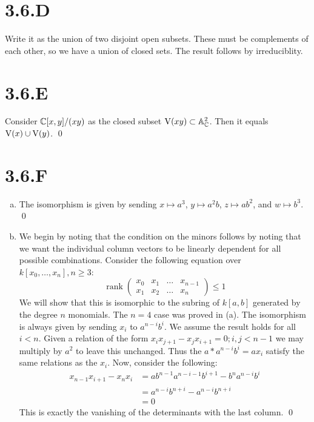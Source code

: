 \documentclass{article}
\begin{document}
\section{3.6.D}
Write it as the union of two disjoint open subsets. These must be complements
of each other, so we have a union of closed sets. The result follows by
irreduciblity.

\section{3.6.E}
Consider $\mathbb{C}[x,y]/(xy)$ as the closed subset $\operatorname{V}(xy) \subset \mathbb{A}^2_{\mathbb{C}}$.
Then it equals $\operatorname{V}(x) \cup \operatorname{V}(y)$. \qed

\section{3.6.F}
\begin{enumerate}[a.]
    \item The isomorphism is given by sending $x \mapsto a^3$,
          $y \mapsto a^2b$, $z \mapsto ab^2$, and $w \mapsto b^3$.
          \qed
    \item We begin by noting that the condition on the minors follows by noting that we
          want the individual column vectors to be linearly dependent for all possible
          combinations. Consider the following equation over $k[x_0, \dots, x_n], n \geq 3$:
          \begin{equation*}
              \operatorname{rank}\begin{pmatrix*}
                  x_0 & x_1 & \dots & x_{n-1} \\ x_1 & x_2 & \dots &
                  x_{n}
              \end{pmatrix*} \leq 1
          \end{equation*}
          We will show that this is isomorphic to the subring of $k[a, b]$
          generated by the degree $n$ monomials. The
          $n=4$ case was proved in (a). The isomorphism is always given
          by sending $x_i$ to $a^{n-i}b^i$. We assume the
          result holds for all $i<n$. Given a relation of the form
          $x_ix_{j+1}-x_jx_{i+1}=0; i, j < n-1$ we may multiply by $a^2$ to leave this
          unchanged. Thus the $a*a^{n-i}b^i = ax_i$ satisfy the same relations as the
          $x_i$. Now, consider the following:
          \begin{align*}
              x_{n-1}x_{i+1}-x_nx_i & = ab^{n-1}a^{n-i-1}b^{i+1}-b^na^{n-i}b^i \\
                                    & = a^{n-i}b^{n+i}-a^{n-i}b^{n+i}          \\
                                    & =0
          \end{align*}
          This is exactly the vanishing of the determinants with the last column. \qed
\end{enumerate}
\end{document}
